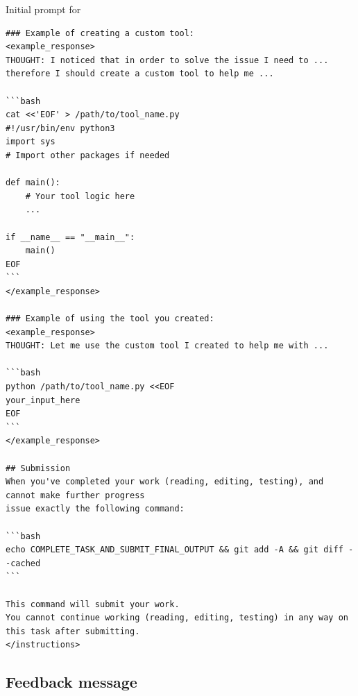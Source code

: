 \begin{promptbox}{Initial prompt for \tech{}}
\begin{Verbatim}[breaklines=true]
### Example of creating a custom tool:
<example_response>
THOUGHT: I noticed that in order to solve the issue I need to ... therefore I should create a custom tool to help me ...

```bash
cat <<'EOF' > /path/to/tool_name.py
#!/usr/bin/env python3
import sys
# Import other packages if needed

def main():
    # Your tool logic here
    ...

if __name__ == "__main__":
    main()
EOF
```
</example_response>

### Example of using the tool you created:
<example_response>
THOUGHT: Let me use the custom tool I created to help me with ...

```bash
python /path/to/tool_name.py <<EOF
your_input_here
EOF
```
</example_response>

## Submission
When you've completed your work (reading, editing, testing), and cannot make further progress
issue exactly the following command:

```bash
echo COMPLETE_TASK_AND_SUBMIT_FINAL_OUTPUT && git add -A && git diff --cached
```

This command will submit your work.
You cannot continue working (reading, editing, testing) in any way on this task after submitting.
</instructions>
\end{Verbatim}
\end{promptbox}
\captionsetup{type=figure}
\label{fig:initial_prompt}



\subsection{Feedback message}


